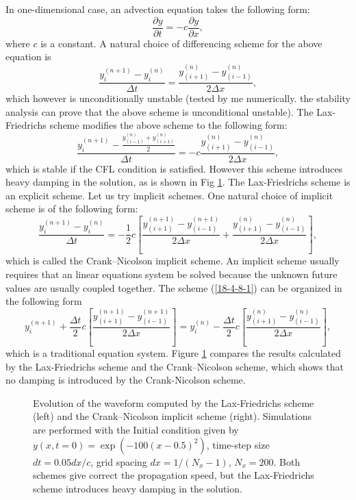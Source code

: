 \documentclass{article}
\begin{document}
In one-dimensional case, an advection equation takes the following form:
\begin{equation}
  \frac{\partial y}{\partial t} = - c \frac{\partial y}{\partial x},
\end{equation}
where $c$ is a constant. A natural choice of differencing scheme for the above
equation is
\begin{equation}
  \frac{y_i^{(n + 1)} - y_i^{(n)}}{\Delta t} = \frac{y_{(i + 1)}^{(n)} - y_{(i
  - 1)}^{(n)}}{2 \Delta x},
\end{equation}
which however is unconditionally unstable (tested by me numerically. the
stability analysis can prove that the above scheme is unconditional
unstable{\cite{Fitzpatrickcp}}). The Lax-Friedrichs scheme modifies the above
scheme to the following form:
\begin{equation}
  \frac{y_i^{(n + 1)} - \frac{y_{ (i - 1)}^{(n)} + y_{(i +
  1)}^{(n)}}{2}}{\Delta t} = - c \frac{y_{(i + 1)}^{(n)} - y_{(i -
  1)}^{(n)}}{2 \Delta x},
\end{equation}
which is stable if the CFL condition is satisfied. However this scheme
introduces heavy damping in the solution, as is shown in Fig \ref{18-4-9-2}.
The Lax-Friedrichs scheme is an explicit scheme. Let us try implicit schemes.
One natural choice of implicit scheme is of the following form:
\begin{equation}
  \label{18-4-8-1} \frac{y_i^{(n + 1)} - y_i^{(n)}}{\Delta t} = - \frac{1}{2}
  c \left[ \frac{y_{(i + 1)}^{(n + 1)} - y_{(i - 1)}^{(n + 1)}}{2 \Delta x} +
  \frac{y_{(i + 1)}^{(n)} - y_{(i - 1)}^{(n)}}{2 \Delta x} \right],
\end{equation}
which is called the Crank--Nicolson implicit scheme. An implicit scheme
usually requires that an linear equations system be solved because the unknown
future values are usually coupled together. The scheme (\ref{18-4-8-1}) can be
organized in the following form
\begin{equation}
  y_i^{(n + 1)} + \frac{\Delta t}{2} c \left[ \frac{y_{(i + 1)}^{(n + 1)} -
  y_{(i - 1)}^{(n + 1)}}{2 \Delta x} \right] = y_i^{(n)} - \frac{\Delta t}{2}
  c \left[ \frac{y_{(i + 1)}^{(n)} - y_{(i - 1)}^{(n)}}{2 \Delta x} \right],
\end{equation}
which is a traditional equation system. Figure \ref{18-4-9-2} compares the
results calculated by the Lax-Friedrichs scheme and the Crank--Nicolson
scheme, which shows that no damping is introduced by the Crank-Nicolson
scheme.

\begin{figure}[h]
  \caption{\label{18-4-9-2}Evolution of the waveform computed by the
  Lax-Friedrichs scheme (left) and the Crank--Nicolson implicit scheme
  (right). Simulations are performed with the Initial condition given by $y
  (x, t = 0) = \exp (- 100 (x - 0.5)^2)$, time-step size $d t = 0.05 d x / c$,
  grid spacing $d x = 1 / (N_x - 1)$, $N_x = 200$. Both schemes give correct
  the propagation speed, but the Lax-Friedrichs scheme introduces heavy
  damping in the solution.}
\end{figure}
\end{document}
